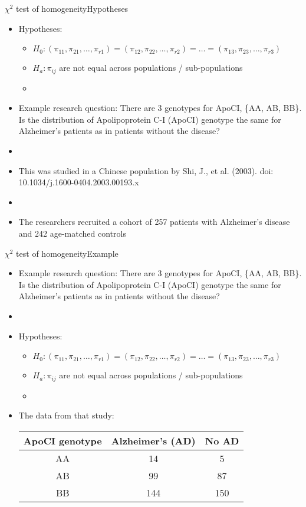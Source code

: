 \documentclass[xcolor=dvipsnames]{beamer}
\begin{document}
\begin{frame}{$\chi^2$ test of homogeneity}{Hypotheses}
\begin{itemize}
	\item Hypotheses:  \pause
	\begin{itemize}
		\item $H_0: (\pi_{11}, \pi_{21}, \hdots, \pi_{r1})=(\pi_{12}, \pi_{22}, \hdots, \pi_{r2})=\dots = (\pi_{13}, \pi_{23}, \hdots, \pi_{r3})$
		\item $H_a: \pi_{ij}$ are not equal across populations / sub-populations
		\item[]
	\end{itemize}  \pause
	\item Example research question: There are 3 genotypes for ApoCI, \{AA, AB, BB\}. Is the distribution of Apolipoprotein C-I (ApoCI) genotype the same for Alzheimer's patients as in patients without the disease?  \pause 
	\item[]
	\item This was studied in a Chinese population by Shi, J., et al. (2003). doi: 10.1034/j.1600-0404.2003.00193.x  \pause
	\item[]
	\item The researchers recruited a cohort of 257 patients with Alzheimer's disease and 242 age-matched controls
\end{itemize}
\end{frame}

\begin{frame}{$\chi^2$ test of homogeneity}{Example}
\begin{itemize}
	\item Example research question: There are 3 genotypes for ApoCI, \{AA, AB, BB\}. Is the distribution of Apolipoprotein C-I (ApoCI) genotype the same for Alzheimer's patients as in patients without the disease?  
	\item[]
	\item Hypotheses:
	\begin{itemize}
		\item $H_0: (\pi_{11}, \pi_{21}, \hdots, \pi_{r1})=(\pi_{12}, \pi_{22}, \hdots, \pi_{r2})=\dots = (\pi_{13}, \pi_{23}, \hdots, \pi_{r3})$
		\item $H_a: \pi_{ij}$ are not equal across populations / sub-populations
		\item[]
	\end{itemize}
	\item The data from that study:  \pause
	\begin{center}
		\begin{tabular}{c|cc}
			\hline
			\textbf{ApoCI genotype} & \textbf{Alzheimer's (AD)} & \textbf{No AD} \\ \hline
			AA & 14 & 5 \\
			AB & 99 & 87 \\
			BB & 144 & 150 \\ \hline
		\end{tabular}
	\end{center}
\end{itemize}
\end{frame}
\end{document}
